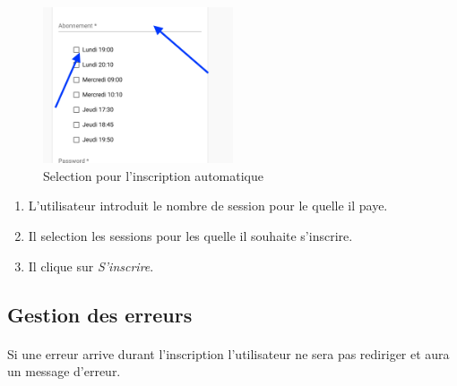 \begin{figure}[h]
	\includegraphics[width=0.5\textwidth,center]{Figures/us4-1}
	\caption{Selection pour l'inscription automatique}
\end{figure}

\begin{enumerate}
	\item L'utilisateur introduit le nombre de session pour le quelle il paye.
	\item Il selection les sessions pour les quelle il souhaite s'inscrire.
	\item Il clique sur \textit{S'inscrire}.
\end{enumerate}

\subsection{Gestion des erreurs}
	\paragraph{}
		Si une erreur arrive durant l'inscription l'utilisateur ne sera pas rediriger et aura un message d'erreur. 
	
